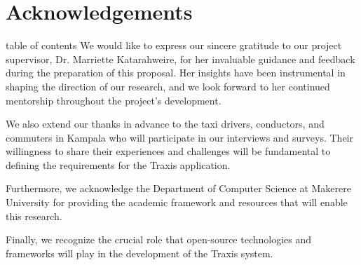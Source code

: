 \chapter*{Acknowledgements}
table of contents We would like to express our sincere gratitude to our project
supervisor, Dr. Marriette Katarahweire, for her invaluable guidance and feedback
during the preparation of this proposal. Her insights have been instrumental in
shaping the direction of our research, and we look forward to her continued
mentorship throughout the project's development.


We also extend our thanks in advance to the taxi drivers, conductors, and
commuters in Kampala who will participate in our interviews and surveys. Their
willingness to share their experiences and challenges will be fundamental to
defining the requirements for the Traxis application.



Furthermore, we acknowledge the Department of Computer Science at Makerere
University for providing the academic framework and resources that will enable
this research.


Finally, we recognize the crucial role that open-source technologies and
frameworks will play in the development of the Traxis system.
